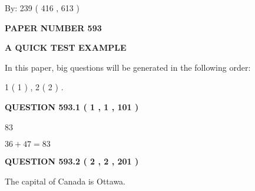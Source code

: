 \documentclass[12pt]{article}
\begin{document}
   
\hspace{1.0in} By: 
 239 ( 416 ,  613 )
   
   
   
   
\newpage 
\setcounter{page}{ 
   593001 } 
   
   
   
   
 {\textbf{ \Large{ PAPER NUMBER  593  }}}
   
   
\vspace{0.2in}
   
   
   
   
   
   
 \vspace{0.2in}
{\LARGE {\textbf{ A QUICK TEST EXAMPLE}}}
   
   
   
\vspace{0.2in}
   
In this paper, big questions will be generated in the following order: 
   
   
   1 ( 1 )
 ,
   2 ( 2 )
 .
  
\vspace{0.2in}
  
{\textbf{\Large{QUESTION
593.1 
 ( 1 , 1 , 101 )
}}}
  
  
 
 
\noindent{}

83
 
 
 
 
\noindent{}

$ %
36 +  %
47=   %
83$
 
 
  
\vspace{0.2in}
  
{\textbf{\Large{QUESTION
593.2 
 ( 2 , 2 , 201 )
}}}
  
  
 
 
\noindent{}
 
 
The capital of Canada is Ottawa.
 
 
 
 
   
   
 \vspace{0.2in}
 
\end{document}
